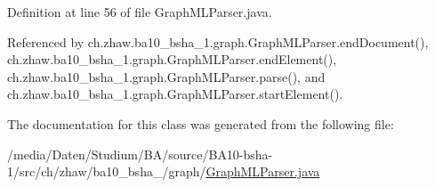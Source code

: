 Definition at line 56 of file GraphMLParser.java.

Referenced by ch.zhaw.ba10\_\-bsha\_\-1.graph.GraphMLParser.endDocument(), ch.zhaw.ba10\_\-bsha\_\-1.graph.GraphMLParser.endElement(), ch.zhaw.ba10\_\-bsha\_\-1.graph.GraphMLParser.parse(), and ch.zhaw.ba10\_\-bsha\_\-1.graph.GraphMLParser.startElement().

The documentation for this class was generated from the following file:\begin{DoxyCompactItemize}
\item 
/media/Daten/Studium/BA/source/BA10-\/bsha-\/1/src/ch/zhaw/ba10\_\-bsha\_/graph/\hyperlink{GraphMLParser_8java}{GraphMLParser.java}\end{DoxyCompactItemize}
